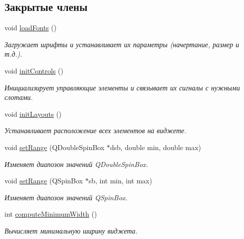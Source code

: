 \subsection*{Закрытые члены}
\begin{DoxyCompactItemize}
\item 
void \hyperlink{class_filter_parameters_widget_aeadea883731fe8ef61b3577319578e02}{load\+Fonts} ()
\begin{DoxyCompactList}\small\item\em Загружает шрифты и устанавливает их параметры (начертание, размер и т.\+д.). \end{DoxyCompactList}\item 
void \hyperlink{class_filter_parameters_widget_a4f05c0618d6e1f55521da3390266821f}{init\+Controls} ()\hypertarget{class_filter_parameters_widget_a4f05c0618d6e1f55521da3390266821f}{}\label{class_filter_parameters_widget_a4f05c0618d6e1f55521da3390266821f}

\begin{DoxyCompactList}\small\item\em Инициализирует управляющие элементы и связывает их сигналы с нужными слотами. \end{DoxyCompactList}\item 
void \hyperlink{class_filter_parameters_widget_a2381f9066d935a3e140d29e785d23f80}{init\+Layouts} ()\hypertarget{class_filter_parameters_widget_a2381f9066d935a3e140d29e785d23f80}{}\label{class_filter_parameters_widget_a2381f9066d935a3e140d29e785d23f80}

\begin{DoxyCompactList}\small\item\em Устанавливает расположение всех элементов на виджете. \end{DoxyCompactList}\item 
void \hyperlink{class_filter_parameters_widget_afca68a62342f0aa6be9133df55134993}{set\+Range} (Q\+Double\+Spin\+Box $\ast$dsb, double min, double max)
\begin{DoxyCompactList}\small\item\em Изменяет диапозон значений Q\+Double\+Spin\+Box. \end{DoxyCompactList}\item 
void \hyperlink{class_filter_parameters_widget_a5ba781e8221a8cc8003a950fafed1fc1}{set\+Range} (Q\+Spin\+Box $\ast$sb, int min, int max)
\begin{DoxyCompactList}\small\item\em Изменяет диапозон значений Q\+Spin\+Box. \end{DoxyCompactList}\item 
int \hyperlink{class_filter_parameters_widget_aac02d00c8d38c893f046e160765ded10}{compute\+Minimum\+Width} ()
\begin{DoxyCompactList}\small\item\em Вычисляет минимальную ширину виджета. \end{DoxyCompactList}\end{DoxyCompactItemize}
